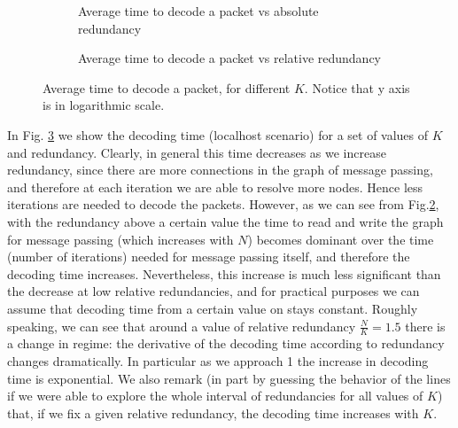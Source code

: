 \begin{figure}[h!]
\centering
\begin{subfigure}{0.4\textwidth}
	\captionsetup{justification=centering,font=scriptsize}
	\setlength{}
	\setlength{}
	
	\caption{Average time to decode a packet vs absolute redundancy}
	\label{fig:decoding_time}
\end{subfigure}\hspace{2em}%
\begin{subfigure}{0.4\textwidth}
	\captionsetup{justification=centering,font=scriptsize}
	\setlength{}
	\setlength{}
	
	\caption{Average time to decode a packet vs relative redundancy}
	\label{fig:decoding_time_rel}
\end{subfigure}
\caption{Average time to decode a packet, for different $K$. Notice that y axis is in logarithmic scale.}
\label{fig:dc_all}
\end{figure}

In Fig. \ref{fig:dc_all} we show the decoding time (localhost scenario) for a set of values of $K$ and redundancy. Clearly, in general this time decreases as we increase redundancy, since there are more connections in the graph of message passing, and therefore at each iteration we are able to resolve more nodes. Hence less iterations are needed to decode the packets. However, as we can see from Fig.\ref{fig:decoding_time_rel}, with the redundancy above a certain value the time to read and write the graph for message passing (which increases with $N$) becomes dominant over the time (number of iterations) needed for message passing itself, and therefore the decoding time increases. Nevertheless, this increase is much less significant than the decrease at low relative redundancies, and for practical purposes we can assume that decoding time from a certain value on stays constant. Roughly speaking, we can see that around a value of relative redundancy $\frac{N}{K}=1.5$ there is a change in regime: the derivative of the decoding time according to redundancy changes dramatically. In particular as we approach 1 the increase in decoding time is exponential. We also remark (in part by guessing the behavior of the lines if we were able to explore the whole interval of redundancies for all values of $K$) that, if we fix a given relative redundancy, the decoding time increases with $K$.


